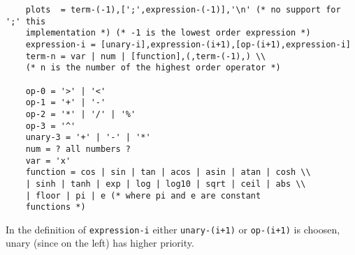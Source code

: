\begin{verbatim}
    plots  = term-(-1),[';',expression-(-1)],'\n' (* no support for ';' this
    implementation *) (* -1 is the lowest order expression *)
    expression-i = [unary-i],expression-(i+1),[op-(i+1),expression-i]
    term-n = var | num | [function],(,term-(-1),) \\
    (* n is the number of the highest order operator *)

    op-0 = '>' | '<'
    op-1 = '+' | '-'
    op-2 = '*' | '/' | '%'
    op-3 = '^'
    unary-3 = '+' | '-' | '*' 
    num = ? all numbers ?
    var = 'x'
    function = cos | sin | tan | acos | asin | atan | cosh \\
    | sinh | tanh | exp | log | log10 | sqrt | ceil | abs \\
    | floor | pi | e (* where pi and e are constant
    functions *)
\end{verbatim}
In the definition of \texttt{expression-i} either \texttt{unary-(i+1)} or
\texttt{op-(i+1)} is choosen, unary (since on the left) has higher priority.
